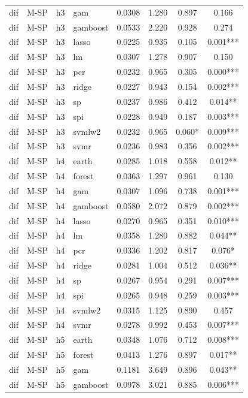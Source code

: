 \begin{ThreePartTable}
\begin{longtable}[t]{llclcccc}
dif & M-SP & h3 & gam & 0.0308 & 1.280 & 0.897 & 0.166\\
dif & M-SP & h3 & gamboost & 0.0533 & 2.220 & 0.928 & 0.274\\
dif & M-SP & h3 & lasso & 0.0225 & 0.935 & 0.105 & 0.001***\\
dif & M-SP & h3 & lm & 0.0307 & 1.278 & 0.907 & 0.150\\
dif & M-SP & h3 & pcr & 0.0232 & 0.965 & 0.305 & 0.000***\\
dif & M-SP & h3 & ridge & 0.0227 & 0.943 & 0.154 & 0.002***\\
dif & M-SP & h3 & sp & 0.0237 & 0.986 & 0.412 & 0.014**\\
dif & M-SP & h3 & spi & 0.0228 & 0.949 & 0.187 & 0.003***\\
dif & M-SP & h3 & svmlw2 & 0.0232 & 0.965 & 0.060* & 0.009***\\
dif & M-SP & h3 & svmr & 0.0236 & 0.983 & 0.356 & 0.002***\\
\addlinespace
dif & M-SP & h4 & earth & 0.0285 & 1.018 & 0.558 & 0.012**\\
dif & M-SP & h4 & forest & 0.0363 & 1.297 & 0.961 & 0.130\\
dif & M-SP & h4 & gam & 0.0307 & 1.096 & 0.738 & 0.001***\\
dif & M-SP & h4 & gamboost & 0.0580 & 2.072 & 0.879 & 0.002***\\
dif & M-SP & h4 & lasso & 0.0270 & 0.965 & 0.351 & 0.010***\\
dif & M-SP & h4 & lm & 0.0358 & 1.280 & 0.882 & 0.044**\\
dif & M-SP & h4 & pcr & 0.0336 & 1.202 & 0.817 & 0.076*\\
dif & M-SP & h4 & ridge & 0.0281 & 1.004 & 0.512 & 0.036**\\
dif & M-SP & h4 & sp & 0.0267 & 0.954 & 0.291 & 0.007***\\
dif & M-SP & h4 & spi & 0.0265 & 0.948 & 0.259 & 0.003***\\
dif & M-SP & h4 & svmlw2 & 0.0315 & 1.125 & 0.890 & 0.457\\
dif & M-SP & h4 & svmr & 0.0278 & 0.992 & 0.453 & 0.007***\\
\addlinespace
dif & M-SP & h5 & earth & 0.0348 & 1.076 & 0.712 & 0.008***\\
dif & M-SP & h5 & forest & 0.0413 & 1.276 & 0.897 & 0.017**\\
dif & M-SP & h5 & gam & 0.1181 & 3.649 & 0.896 & 0.043**\\
dif & M-SP & h5 & gamboost & 0.0978 & 3.021 & 0.885 & 0.006***\\

\end{longtable}
\end{ThreePartTable}

